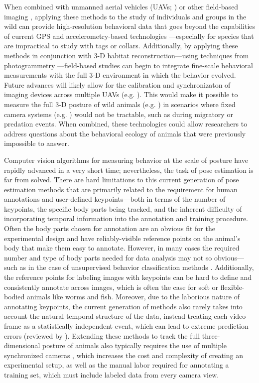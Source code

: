 \documentclass[11pt,a4paper,oneside]{article}
\begin{document}
When combined with unmanned aerial vehicles (UAVs; \citealt{schiffman2014drones}) or other field-based imaging \citep{fritz2019lowcost}, applying these methods to the study of individuals and groups in the wild can provide high-resolution behavioral data that goes beyond the capabilities of current GPS and accelerometry-based technologies \citep{nagy2010hierarchical,nagy2013context,kays2015terrestrial,strandburg2015shared,strandburg2017habitat,flack2018local}—especially for species that are impractical to study with tags or collars. Additionally, by applying these methods in conjunction with 3-D habitat reconstruction—using techniques from photogrammetry  \citep{strandburg2017habitat, fritz2019lowcost}—field-based studies can begin to integrate fine-scale behavioral measurements with the full 3-D environment in which the behavior evolved. Future advances will likely allow for the calibration and synchronizaton of imaging devices across multiple UAVs (e.g. \citealt{price2018deep, Nitin_ICCV_19}). This would make it possible to measure the full 3-D posture of wild animals (e.g. \citealt{Zuffi:ICCV:2019}) in scenarios where fixed camera systems (e.g. \citealt{nath2018}) would not be tractable, such as during migratory or predation events. When combined, these technologies could allow researchers to address questions about the behavioral ecology of animals that were previously impossible to answer.

Computer vision algorithms for measuring behavior at the scale of posture have rapidly advanced in a very short time; nevertheless, the task of pose estimation is far from solved. There are hard limitations to this current generation of pose estimation methods that are primarily related to the requirement for human annotations and user-defined keypoints---both in terms of the number of keypoints, the specific body parts being tracked, and the inherent difficulty of incorporating temporal information into the annotation and training procedure. Often the body parts chosen for annotation are an obvious fit for the experimental design and have reliably-visible reference points on the animal's body that make them easy to annotate. However, in many cases the required number and type of body parts needed for data analysis may not so obvious---such as in the case of unsupervised behavior classification methods \citep{berman2014mapping, pereira2019fast}. Additionally, the reference points for labeling images with keypoints can be hard to define and consistently annotate across images, which is often the case for soft or flexible-bodied animals like worms and fish. Moreover, due to the laborious nature of annotating keypoints, the current generation of methods also rarely takes into account the natural temporal structure of the data, instead treating each video frame as a statistically independent event, which can lead to extreme prediction errors (reviewed by \citealt{seethapathi2019movement}). Extending these methods to track the full three-dimensional posture of animals also typically requires the use of multiple synchronized cameras \citep{nath2018, gunel2019deepfly3d}, which increases the cost and complexity of creating an experimental setup, as well as the manual labor required for annotating a training set, which must include labeled data from every camera view.
\end{document}
